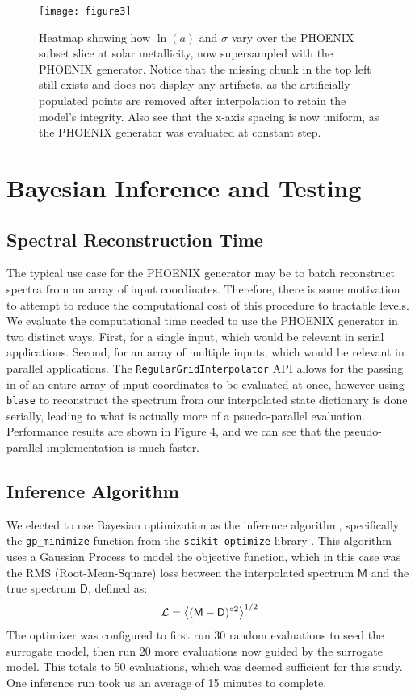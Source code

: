 \documentclass[twocolumn]{aastex631}
\begin{document}
\begin{figure}
    \centering
    \texttt{[image: figure3]}
    \caption{Heatmap showing how $\ln(a)$ and $\sigma$ vary over the PHOENIX 
    subset slice at solar metallicity, now supersampled with the PHOENIX 
    generator. Notice that the missing chunk in the top left still exists 
    and does not display any artifacts, as the artificially populated points 
    are removed after interpolation to retain the model's integrity. Also
    see that the x-axis spacing is now uniform, as the PHOENIX generator 
    was evaluated at constant step.}
\end{figure}

\section{Bayesian Inference and Testing}
\subsection{Spectral Reconstruction Time}
The typical use case for the PHOENIX generator may be to batch 
reconstruct spectra from an array of input coordinates. Therefore, there
is some motivation to attempt to reduce the computational cost of this
procedure to tractable levels. We evaluate the computational time needed
to use the PHOENIX generator in two distinct ways. First, for a single
input, which would be relevant in serial applications. Second, for an array
of multiple inputs, which would be relevant in parallel applications.
The \texttt{RegularGridInterpolator} API allows for the passing in of 
an entire array of input coordinates to be evaluated at once, however 
using \texttt{blase} to reconstruct the spectrum from our interpolated
state dictionary is done serially, leading to what is actually more of 
a psuedo-parallel evaluation. Performance results are shown in Figure 4,
and we can see that the pseudo-parallel implementation is much faster.

\subsection{Inference Algorithm}
We elected to use Bayesian optimization as the inference algorithm, specifically 
the \texttt{gp\_minimize} function from the \texttt{scikit-optimize} library \citep{skopt}. 
This algorithm uses a Gaussian Process to model the objective function, which in 
this case was the RMS (Root-Mean-Square) loss between the interpolated spectrum 
$\mathsf{M}$ and the true spectrum $\mathsf{D}$, defined as:
\begin{gather}
    \mathcal{L} = \ev{(\mathsf{M} - \mathsf{D})^{\circ 2}}^{1/2}
\end{gather}
The optimizer was configured to first run 30 random 
evaluations to seed the surrogate model, then run 20 more evaluations now guided 
by the surrogate model. This totals to 50 evaluations, which was deemed 
sufficient for this study. One inference run took us an average of 15 minutes to 
complete.
\end{document}
